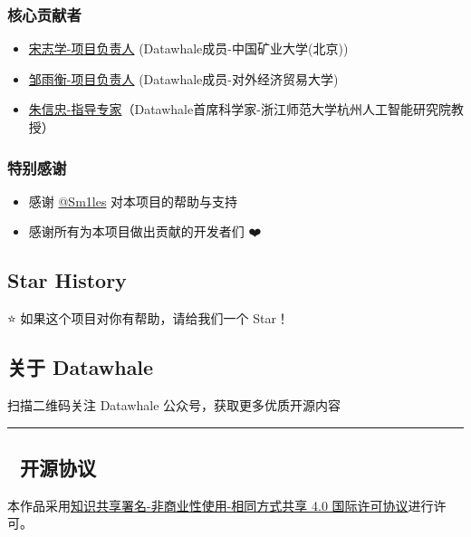 \documentclass[
]{article}
\providecommand{\tightlist}{%
  \setlength{\itemsep}{0pt}\setlength{\parskip}{0pt}}
\begin{document}
\subsubsection{核心贡献者}\label{ux6838ux5fc3ux8d21ux732eux8005}

\begin{itemize}
\tightlist
\item
  \href{https://github.com/KMnO4-zx}{宋志学-项目负责人}
  (Datawhale成员-中国矿业大学(北京))
\item
  \href{https://github.com/logan-zou}{邹雨衡-项目负责人}
  (Datawhale成员-对外经济贸易大学)
\item
  \href{https://xinzhongzhu.github.io/}{朱信忠-指导专家}（Datawhale首席科学家-浙江师范大学杭州人工智能研究院教授）
\end{itemize}

\subsubsection{特别感谢}\label{ux7279ux522bux611fux8c22}

\begin{itemize}
\tightlist
\item
  感谢 \href{https://github.com/Sm1les}{@Sm1les} 对本项目的帮助与支持
\item
  感谢所有为本项目做出贡献的开发者们 ❤️
\end{itemize}

\subsection{Star History}\label{star-history}

⭐ 如果这个项目对你有帮助，请给我们一个 Star！

\subsection{关于 Datawhale}\label{ux5173ux4e8e-datawhale}

扫描二维码关注 Datawhale 公众号，获取更多优质开源内容

\begin{center}\rule{0.5\linewidth}{0.5pt}\end{center}

\subsection{📜 开源协议}\label{ux5f00ux6e90ux534fux8bae}

本作品采用\href{http://creativecommons.org/licenses/by-nc-sa/4.0/}{知识共享署名-非商业性使用-相同方式共享
4.0 国际许可协议}进行许可。
\end{document}
